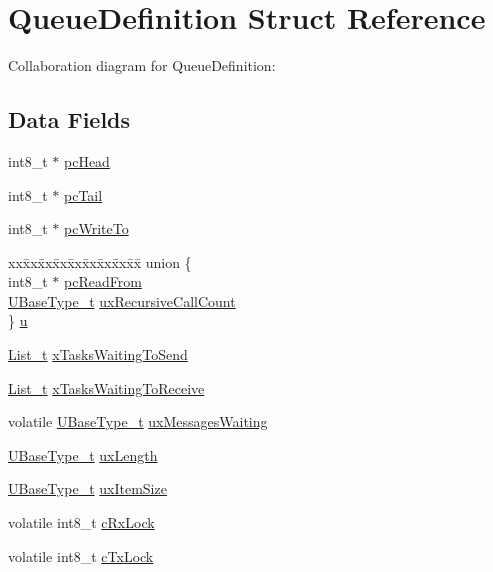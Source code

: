 \hypertarget{struct_queue_definition}{}\section{Queue\+Definition Struct Reference}
\label{struct_queue_definition}


Collaboration diagram for Queue\+Definition\+:
\subsection*{Data Fields}
\begin{DoxyCompactItemize}
\item 
int8\+\_\+t $\ast$ \hyperlink{struct_queue_definition_adfa75f7bc22a3a58a907676c0164a1c1}{pc\+Head}
\item 
int8\+\_\+t $\ast$ \hyperlink{struct_queue_definition_aec0a6e253e1e05c107bf2a77c1bed940}{pc\+Tail}
\item 
int8\+\_\+t $\ast$ \hyperlink{struct_queue_definition_aa018576801d60d3a78ffacab53dc8b79}{pc\+Write\+To}
\item 
\begin{tabbing}
xx\=xx\=xx\=xx\=xx\=xx\=xx\=xx\=xx\=\kill
union \{\\
\>int8\_t $\ast$ \hyperlink{struct_queue_definition_af716fa534e7d09f91df1fbdd8ab7a693}{pcReadFrom}\\
\>\hyperlink{portmacro_8h_a646f89d4298e4f5afd522202b11cb2e6}{UBaseType\_t} \hyperlink{struct_queue_definition_ae3c791284df4f19b849e56f972b13db4}{uxRecursiveCallCount}\\
\} \hyperlink{struct_queue_definition_a2bdddbc5c1424030e26737326e310f2a}{u}\\

\end{tabbing}\item 
\hyperlink{list_8h_afd590ef6400071b4d63d65ef90bea7f4}{List\+\_\+t} \hyperlink{struct_queue_definition_a5cfd8ae6db5da134ed16405043a0d898}{x\+Tasks\+Waiting\+To\+Send}
\item 
\hyperlink{list_8h_afd590ef6400071b4d63d65ef90bea7f4}{List\+\_\+t} \hyperlink{struct_queue_definition_a8ad185d9d83713c774e6a897580d8313}{x\+Tasks\+Waiting\+To\+Receive}
\item 
volatile \hyperlink{portmacro_8h_a646f89d4298e4f5afd522202b11cb2e6}{U\+Base\+Type\+\_\+t} \hyperlink{struct_queue_definition_afb61b3f2247402ed3b8b159311c408b7}{ux\+Messages\+Waiting}
\item 
\hyperlink{portmacro_8h_a646f89d4298e4f5afd522202b11cb2e6}{U\+Base\+Type\+\_\+t} \hyperlink{struct_queue_definition_a619169da78e43281a73fbdf13f9eddfb}{ux\+Length}
\item 
\hyperlink{portmacro_8h_a646f89d4298e4f5afd522202b11cb2e6}{U\+Base\+Type\+\_\+t} \hyperlink{struct_queue_definition_a216cc99516d7f82573f6cb19f5a9f626}{ux\+Item\+Size}
\item 
volatile int8\+\_\+t \hyperlink{struct_queue_definition_a2017e9e2e81e1fd301fa88236614653e}{c\+Rx\+Lock}
\item 
volatile int8\+\_\+t \hyperlink{struct_queue_definition_a77c52e94671f477fd2942db97e20838b}{c\+Tx\+Lock}
\end{DoxyCompactItemize}


